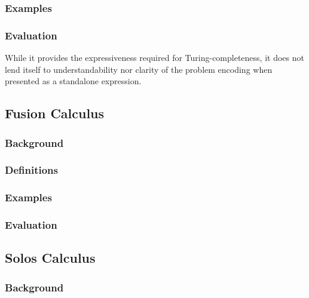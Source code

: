 \documentclass{article}
\begin{document}
        \subsubsection{Examples}


        \subsubsection{Evaluation}
            While it provides the expressiveness required for Turing-completeness, it does not lend itself to understandability nor clarity of the problem encoding when presented as a standalone expression.



    \subsection{Fusion Calculus}

        \subsubsection{Background}
            \cite{fusion-calculus}


        \subsubsection{Definitions}


        \subsubsection{Examples}


        \subsubsection{Evaluation}



    \subsection{Solos Calculus}

        \subsubsection{Background}
            \cite{acyclic-solos}
\end{document}
